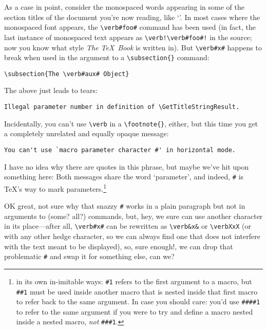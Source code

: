 As a case in point, consider the monospaced words appearing in some of the section
titles of the document you're now reading, like `'. In most cases where the
monospaced font appears, the \verb!\verb#foo#! command has been used (in fact, the last instance of monospaced
text appears as \verb°\verb!\verb#foo#!° in the source; now you know what style {\em The \TeX\ Book} is written
in). But \verb!\verb#x#! happens to break when used in the argument to a \verb#\subsection{}#
command:

\begin{verbatim}
\subsection{The \verb#aux# Object}
\end{verbatim}

The above just leads to tears:

\begin{verbatim}
Illegal parameter number in definition of \GetTitleStringResult.
\end{verbatim}

Incidentally, you can't use \verb#\verb# in a \verb#\footnote{}#, either, but this time you get
a completely unrelated and equally opaque message:

\begin{verbatim}
You can't use `macro parameter character #' in horizontal mode.
\end{verbatim}

I have no idea why there are quotes in this phrase, but maybe we've hit upon something here: Both messages
share the word `parameter', and indeed, \verb°#° is \TeX's way to mark parameters.\footnote{in its own
in-imitable ways: \texttt{\#1} refers to the first argument to a macro, but \texttt{\#\#1} must be used
inside another macro that is nested inside that first macro to refer back to the same argument. In case
you should care: you'd use \texttt{\#\#\#\#1} to refer to the same argument if you were to try
and define a macro nested inside a nested macro, {\em not} \texttt{\#\#\#1}.}

OK great, not sure why that snazzy \verb°#° works in a plain paragraph but not in arguments to (some? all?)
commands, but, hey, we sure can use another character in its place---after all, \verb§\verb#x#§ can be
rewritten as \verb§\verb&x&§ or \verb§\verbXxX§ (or with any other hedge character, so we can always find
one that does not interfere with the text meant to be displayed), so, sure enough!, we can drop that
problematic \verb°#° and swap it for something else, can we?

